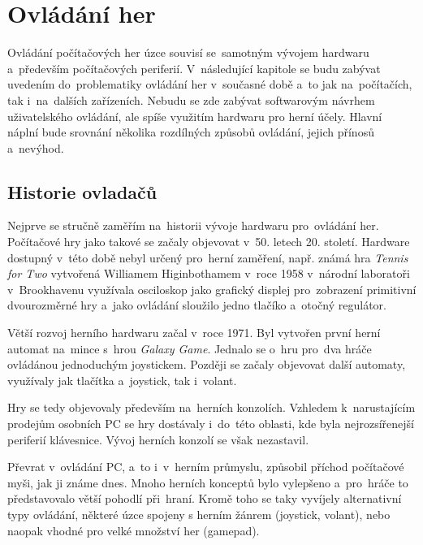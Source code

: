 \documentclass[thesis=B,czech,hidelinks]{FITthesis}[2012/06/26] %
\begin{document}
\chapter{Ovládání her}

Ovládání počítačových her úzce souvisí se~samotným vývojem hardwaru a~především počítačových periferií. V~následující kapitole se budu zabývat uvedením do~problematiky ovládání her v~současné době a~to jak na~počítačích, tak i~na~dalších zařízeních. Nebudu se zde zabývat softwarovým návrhem uživatelského ovládání, ale spíše využitím hardwaru pro herní účely. Hlavní náplní bude srovnání několika rozdílných způsobů ovládání, jejich přínosů a~nevýhod. 


\section{Historie ovladačů}

Nejprve se stručně zaměřím na~historii vývoje hardwaru pro~ovládání her. Počítačové hry jako takové se začaly objevovat v~50. letech 20. století. Hardware dostupný v~této době nebyl určený pro~herní zaměření, např. známá hra \textit{Tennis for Two} vytvořená Williamem Higinbothamem v~roce 1958 v~národní laboratoři v~Brookhavenu využívala osciloskop jako grafický displej pro~zobrazení primitivní dvourozměrné hry a~jako ovládání sloužilo jedno tlačíko a~otočný regulátor.\cite{gamevshardware}

Větší rozvoj herního hardwaru začal v~roce 1971. Byl vytvořen první herní automat na~mince s~hrou \textit{Galaxy Game}. Jednalo se o~hru pro~dva hráče ovládánou jednoduchým joystickem. Později se začaly objevovat další automaty, využívaly jak tlačítka a~joystick, tak i~volant.

Hry se tedy objevovaly především na~herních konzolích. Vzhledem k~narustajícím prodejům osobních PC se hry dostávaly i~do~této oblasti, kde byla nejrozsířenejší periferií klávesnice. Vývoj herních konzolí se však nezastavil.

Převrat v~ovládání PC, a~to i~v~herním průmyslu, způsobil příchod počítačové myši, jak ji známe dnes. Mnoho herních konceptů bylo vylepšeno a~pro~hráče to představovalo větší pohodlí při~hraní. \cite{gamevshardware} Kromě toho se taky vyvíjely alternativní typy ovládání, některé úzce spojeny s herním žánrem (joystick, volant), nebo naopak vhodné pro velké množství her (gamepad).
\end{document}
